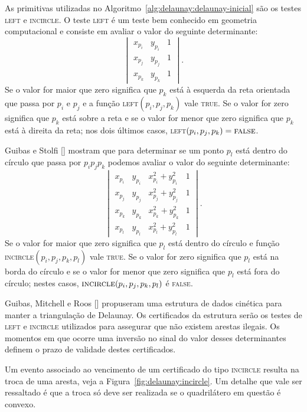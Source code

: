 

As primitivas utilizadas no Algoritmo~\ref{alg:delaunay:delaunay-inicial} são os testes
\textsc{left} e \textsc{incircle}.
O teste \textsc{left} é um teste bem conhecido em geometria computacional e consiste em avaliar o
valor do seguinte determinante:
$$
\begin{vmatrix}
    x_{p_i} & y_{p_i} & 1 \\
    x_{p_j} & y_{p_j} & 1 \\
    x_{p_k} & y_{p_k} & 1
\end{vmatrix}.$$
Se o valor for maior que zero significa que $p_k$ está à esquerda da reta orientada que passa por
$p_i$ e $p_j$ e a função \textsc{left}$(p_i, p_j, p_k)$ vale \textsc{true}.
Se o valor for zero significa que $p_k$ está sobre a reta e se o valor for menor que zero
significa que $p_k$ está à direita da reta;
nos dois últimos casos, \textsc{left}$(p_i, p_j, p_k) = \textsc{false}$.

Guibas e Stolfi [\cite{guibas-stolfi}] mostram que para determinar se um ponto $p_l$ está dentro
do círculo que passa por $p_{i}p_{j}p_{k}$ podemos avaliar o valor do seguinte determinante:
$$
\begin{vmatrix}
    x_{p_i} & y_{p_i} & x_{p_i}^2 + y_{p_i}^2 & 1 \\
    x_{p_j} & y_{p_j} & x_{p_j}^2 + y_{p_j}^2 & 1 \\
    x_{p_k} & y_{p_k} & x_{p_k}^2 + y_{p_k}^2 & 1 \\
    x_{p_l} & y_{p_l} & x_{p_l}^2 + y_{p_l}^2 & 1
\end{vmatrix}.$$
Se o valor for maior que zero significa que $p_l$ está dentro do círculo e função
\textsc{incircle}$(p_i, p_j, p_k, p_l)$ vale \textsc{true}.
Se o valor for zero significa que $p_l$ está na borda do círculo e se o valor for menor que zero
significa que $p_l$ está fora do círculo;
nestes casos, $\textsc{incircle}(p_i, p_j, p_k, p_l)$ é \textsc{false}.

Guibas, Mitchell e Roos [\cite{guibas-mitchell-roos}] propuseram uma estrutura de dados cinética
para manter a triangulação de Delaunay.
Os certificados da estrutura serão os testes de \textsc{left} e \textsc{incircle} utilizados para
assegurar que não existem arestas ilegais.
Os momentos em que ocorre uma inversão no sinal do valor desses determinantes definem o prazo de
validade destes certificados.

Um evento associado ao vencimento de um certificado do tipo \textsc{incircle} resulta na troca de
uma aresta, veja a Figura~\ref{fig:delaunay:incircle}.
Um detalhe que vale ser ressaltado é que a troca só deve ser realizada se o quadrilátero em
questão é convexo.

